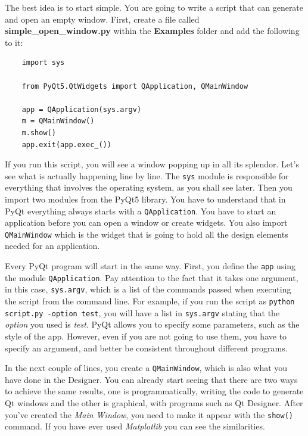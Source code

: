 The best idea is to start simple. You are going to write a script that
can generate and open an empty window. First, create a file called
\textbf{simple\_open\_window.py} within the \textbf{Examples} folder and
add the following to it:

\begin{verbatim}
    import sys

    from PyQt5.QtWidgets import QApplication, QMainWindow

    app = QApplication(sys.argv)
    m = QMainWindow()
    m.show()
    app.exit(app.exec_())
\end{verbatim}

If you run this script, you will see a window popping up in all its
splendor. Let's see what is actually happening line by line. The
\texttt{sys} module is responsible for everything that involves the
operating system, as you shall see later. Then you import two modules
from the PyQt5 library. You have to understand that in PyQt everything
always starts with a \texttt{QApplication}. You have to start an
application before you can open a window or create widgets. You also
import \texttt{QMainWindow} which is the widget that is going to hold
all the design elements needed for an application.

Every PyQt program will start in the same way. First, you define the
\texttt{app} using the module \texttt{QApplication}. Pay attention to
the fact that it takes one argument, in this case, \texttt{sys.argv},
which is a list of the commands passed when executing the script from
the command line. For example, if you run the script as
\texttt{python script.py -option test}, you will have a list in
\texttt{sys.argv} stating that the \emph{option} you used is
\emph{test}. PyQt allows you to specify some parameters, such as the
style of the app. However, even if you are not going to use them, you
have to specify an argument, and better be consistent throughout
different programs.

In the next couple of lines, you create a \texttt{QMainWindow}, which is
also what you have done in the Designer. You can already start seeing
that there are two ways to achieve the same results, one is
programmatically, writing the code to generate Qt windows and the other
is graphical, with programs such as Qt Designer. After you've created
the \emph{Main Window}, you need to make it appear with the
\texttt{show()} command. If you have ever used \emph{Matplotlib} you can
see the similarities.

